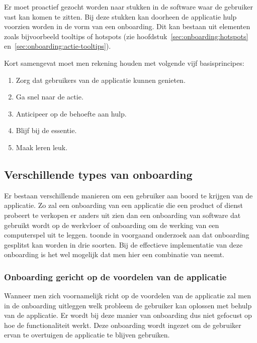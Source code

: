 Er moet proactief gezocht worden naar stukken in de software waar de gebruiker vast kan komen te zitten. Bij deze stukken kan doorheen de applicatie hulp voorzien worden in de vorm van een onboarding. Dit kan bestaan uit elementen zoals bijvoorbeeld tooltips of hotspots (zie hoofdstuk~\ref{sec:onboarding:hotspots} en~\ref{sec:onboarding:actie-tooltips}).

Kort samengevat moet men rekening houden met volgende vijf basisprincipes:
\begin{enumerate}
    \item Zorg dat gebruikers van de applicatie kunnen genieten.
    \item Ga snel naar de actie.
    \item Anticipeer op de behoefte aan hulp.
    \item Blijf bij de essentie.
    \item Maak leren leuk.
\end{enumerate}

\subsection{Verschillende types van onboarding}
\label{sec:onboarding:types}

Er bestaan verschillende manieren om een gebruiker aan boord te krijgen van de applicatie. Zo zal een onboarding van een applicatie die een product of dienst probeert te verkopen er anders uit zien dan een onboarding van software dat gebruikt wordt op de werkvloer of onboarding om de werking van een computerspel uit te leggen. \textcite{Bufe2020} toonde in voorgaand onderzoek aan dat onboarding gesplitst kan worden in drie soorten. Bij de effectieve implementatie van deze onboarding is het wel mogelijk dat men hier een combinatie van neemt.

\subsubsection{Onboarding gericht op de voordelen van de applicatie}
\label{sec:onboarding:types:voordeel}

Wanneer men zich voornamelijk richt op de voordelen van de applicatie zal men in de onboarding uitleggen welk probleem de gebruiker kan oplossen met behulp van de applicatie. Er wordt bij deze manier van onboarding dus niet gefocust op hoe de functionaliteit werkt. Deze onboarding wordt ingezet om de gebruiker ervan te overtuigen de applicatie te blijven gebruiken.

